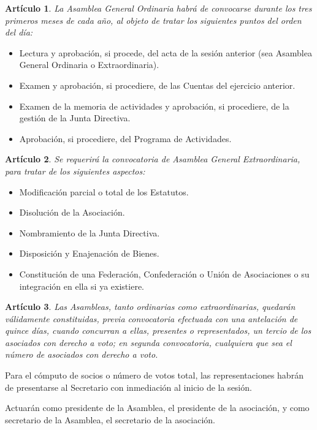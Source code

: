 \documentclass[a4paper,12pt]{article}
\theoremstyle{mystyle}		%
\newtheorem{art}{Artículo}	%
\begin{document}
\begin{onehalfspace}
\begin{art}
La Asamblea General Ordinaria habrá de convocarse durante los tres primeros meses de cada año, al objeto de tratar los siguientes puntos del orden del día:
\end{art}
\begin{itemize}
\item [1.-] Lectura y aprobación, si procede, del acta de la sesión anterior (sea Asamblea General Ordinaria o Extraordinaria).
\item [2.-] Examen y aprobación, si procediere, de las Cuentas del ejercicio anterior.
\item [3.-] Examen de la memoria de actividades y aprobación, si procediere, de la gestión de la Junta Directiva.
\item [4.-] Aprobación, si procediere, del Programa de Actividades.
\end{itemize}

\begin{art}
Se requerirá la convocatoria de Asamblea General Extraordinaria, para tratar de los siguientes aspectos:
\end{art}
\begin{itemize}
\item [1.-] Modificación parcial o total de los Estatutos.
\item [2.-] Disolución de la Asociación.
\item [3.-] Nombramiento de la Junta Directiva.
\item [4.-] Disposición y Enajenación de Bienes.
\item [5.-] Constitución de una Federación, Confederación o Unión de Asociaciones o su integración en ella si ya existiere.
\end{itemize}

\begin{art}
Las Asambleas, tanto ordinarias como extraordinarias, quedarán válidamente constituidas, previa convocatoria efectuada con una antelación de quince días, cuando concurran a ellas, presentes o representados, un tercio de los asociados con derecho a voto; en segunda convocatoria, cualquiera que sea el número de asociados con derecho a voto.
\end{art}

Para el cómputo de socios o número de votos total, las representaciones habrán de presentarse al Secretario con inmediación al inicio de la sesión.

Actuarán como presidente de la Asamblea, el presidente de la asociación, y como secretario de la Asamblea, el secretario de la asociación.


\end{onehalfspace}
\end{document}
